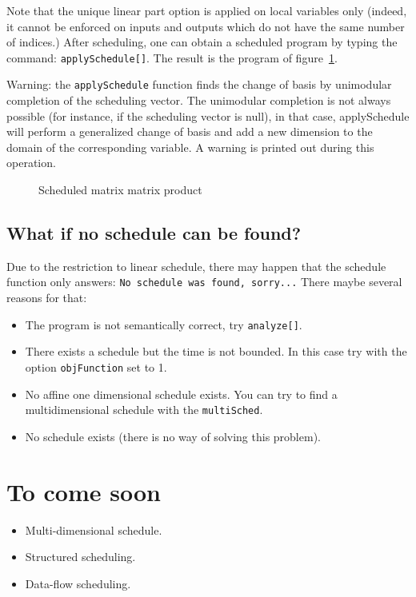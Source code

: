 Note that the unique linear part option is applied on local variables
only (indeed, it cannot be enforced on inputs and outputs which do not have
the same number of indices.) After scheduling, one can obtain a
scheduled program by typing the command: \texttt{applySchedule[]}. The
result is the program of figure~\ref{figSched5}.

Warning: the \texttt{applySchedule} function finds the change of basis 
by unimodular completion of the scheduling vector. The unimodular 
completion is not always possible (for instance, if the scheduling 
vector is null), in that case, applySchedule will perform 
a generalized change of basis and add a new dimension to the domain of 
the corresponding variable. A warning is printed out during this operation.

\begin{figure}[htbp]

\caption{Scheduled  matrix matrix product}
\label{figSched5}
\end{figure}

\subsection{What if no schedule can be found?}
Due to the restriction to linear schedule, there may 
happen that the schedule function only answers: 
\texttt{No schedule was found, sorry...}
There maybe several reasons for that:
\begin{itemize}
\item The program is not semantically correct, try \texttt{analyze[]}.
\item There exists a schedule but the time is not bounded. 
In this case try with the option \texttt{objFunction} set to 1.
\item No affine one dimensional schedule exists. You can try to find
a multidimensional schedule with the \texttt{multiSched}.
\item No schedule exists (there is no way of solving this problem).
\end{itemize}

\section{To come soon}
\begin{itemize}
\item Multi-dimensional schedule.
\item Structured scheduling.
\item Data-flow scheduling. 
\end{itemize}


